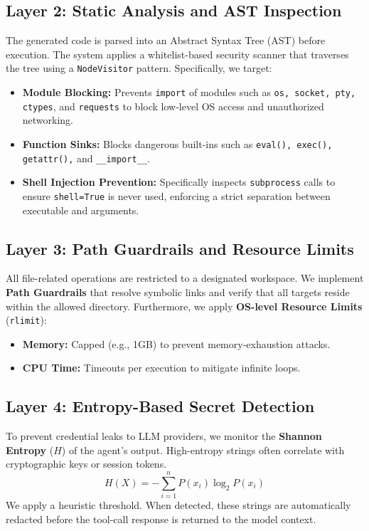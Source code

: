 \documentclass[conference]{IEEEtran}
\begin{document}
\subsection{Layer 2: Static Analysis and AST Inspection}
The generated code is parsed into an Abstract Syntax Tree (AST) before execution. The system applies a whitelist-based security scanner that traverses the tree using a \texttt{NodeVisitor} pattern. Specifically, we target:
\begin{itemize}
    \item \textbf{Module Blocking:} Prevents \texttt{import} of modules such as \texttt{os, socket, pty, ctypes}, and \texttt{requests} to block low-level OS access and unauthorized networking.
    \item \textbf{Function Sinks:} Blocks dangerous built-ins such as \texttt{eval(), exec(), getattr(),} and \texttt{\_\_import\_\_}.
    \item \textbf{Shell Injection Prevention:} Specifically inspects \texttt{subprocess} calls to ensure \texttt{shell=True} is never used, enforcing a strict separation between executable and arguments.
\end{itemize}

\subsection{Layer 3: Path Guardrails and Resource Limits}
All file-related operations are restricted to a designated workspace. We implement \textbf{Path Guardrails} that resolve symbolic links and verify that all targets reside within the allowed directory. 
Furthermore, we apply \textbf{OS-level Resource Limits} (\texttt{rlimit}):
\begin{itemize}
    \item \textbf{Memory:} Capped (e.g., 1GB) to prevent memory-exhaustion attacks.
    \item \textbf{CPU Time:} Timeouts per execution to mitigate infinite loops.
\end{itemize}

\subsection{Layer 4: Entropy-Based Secret Detection}
To prevent credential leaks to LLM providers, we monitor the \textbf{Shannon Entropy} ($H$) of the agent's output. High-entropy strings often correlate with cryptographic keys or session tokens.
\begin{equation}
H(X) = -\sum_{i=1}^{n} P(x_i) \log_2 P(x_i)
\end{equation}
We apply a heuristic threshold. When detected, these strings are automatically redacted before the tool-call response is returned to the model context.
\end{document}
